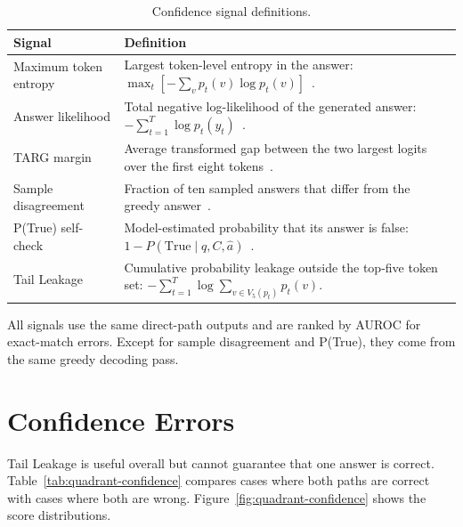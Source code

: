 \documentclass{nthu_thesis}
\begin{document}
\begin{thesiscjk}
\begin{table}[h]
    \centering
    \caption[Confidence Signal Definitions]{Confidence signal definitions.}
    \label{tab:confidence-signal-definitions}
    \setlength{\tabcolsep}{8pt}
    \begin{tabular}{ >{\raggedright\arraybackslash}p{} >{\raggedright\arraybackslash}p{} }
        \toprule
        Signal & Definition \\
        \midrule
        Maximum token entropy
        & Largest token-level entropy in the answer: $\max_t[-\sum_v p_t(v)\log p_t(v)]$~\cite{maqa,targ}. \\
        \addlinespace
        Answer likelihood
        & Total negative log-likelihood of the generated answer: $-\sum_{t=1}^{T}\log p_t(y_t)$~\cite{semanticuncertainty}. \\
        \addlinespace
        TARG margin
        & Average transformed gap between the two largest logits over the first eight tokens~\cite{targ}. \\
        \addlinespace
        Sample disagreement
        & Fraction of ten sampled answers that differ from the greedy answer~\cite{maqa,semanticuncertainty,semanticentropy}. \\
        \addlinespace
        P(True) self-check
        & Model-estimated probability that its answer is false: $1-P(\mathrm{True}\mid q,C,\hat a)$~\cite{kadavath2022}. \\
        \addlinespace
        Tail Leakage
        & Cumulative probability leakage outside the top-five token set: $-\sum_{t=1}^{T}\log\sum_{v\in V_5(p_t)}p_t(v)$. \\
        \bottomrule
    \end{tabular}
\end{table}

All signals use the same direct-path outputs and are ranked by AUROC for exact-match errors. Except for sample disagreement and P(True), they come from the same greedy decoding pass.

\clearpage
\section{Confidence Errors}
\label{app:confidence-diagnostics}

Tail Leakage is useful overall but cannot guarantee that one answer is correct. Table~\ref{tab:quadrant-confidence} compares cases where both paths are correct with cases where both are wrong. Figure~\ref{fig:quadrant-confidence} shows the score distributions.


\end{thesiscjk}
\end{document}
